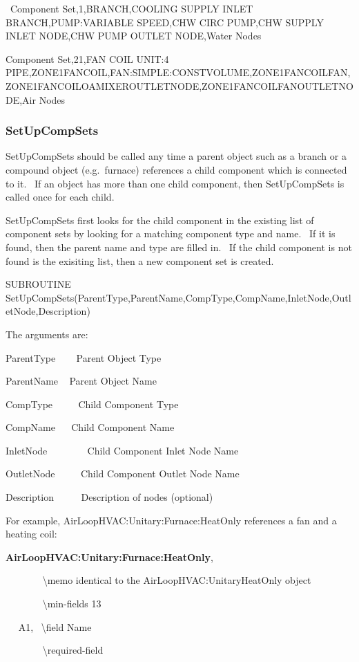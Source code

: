 ~Component Set,1,BRANCH,COOLING SUPPLY INLET BRANCH,PUMP:VARIABLE SPEED,CHW CIRC PUMP,CHW SUPPLY INLET NODE,CHW PUMP OUTLET NODE,Water Nodes

Component Set,21,FAN COIL UNIT:4 PIPE,ZONE1FANCOIL,FAN:SIMPLE:CONSTVOLUME,ZONE1FANCOILFAN,ZONE1FANCOILOAMIXEROUTLETNODE,ZONE1FANCOILFANOUTLETNODE,Air Nodes

\subsubsection{SetUpCompSets}\label{setupcompsets}

SetUpCompSets should be called any time a parent object such as a branch or a compound object (e.g.~furnace) references a child component which is connected to it.~ If an object has more than one child component, then SetUpCompSets is called once for each child.

SetUpCompSets first looks for the child component in the existing list of component sets by looking for a matching component type and name.~ If it is found, then the parent name and type are filled in.~ If the child component is not found is the exisiting list, then a new component set is created.

SUBROUTINE SetUpCompSets(ParentType,ParentName,CompType,CompName,InletNode,OutletNode,Description)

The arguments are:

ParentType ~~~ Parent Object Type

ParentName ~ Parent Object Name

CompType ~~~~ Child Component Type

CompName ~~ Child Component Name

InletNode ~~~~~~~ Child Component Inlet Node Name

OutletNode ~~~~ Child Component Outlet Node Name

Description~~~~~ Description of nodes (optional)

For example, AirLoopHVAC:Unitary:Furnace:HeatOnly references a fan and a heating coil:

\textbf{AirLoopHVAC:Unitary:Furnace:HeatOnly},

~~~~~~~ \textbackslash{}memo identical to the AirLoopHVAC:UnitaryHeatOnly object

~~~~~~~ \textbackslash{}min-fields 13

~~ A1,~ \textbackslash{}field Name

~~~~~~~ \textbackslash{}required-field

